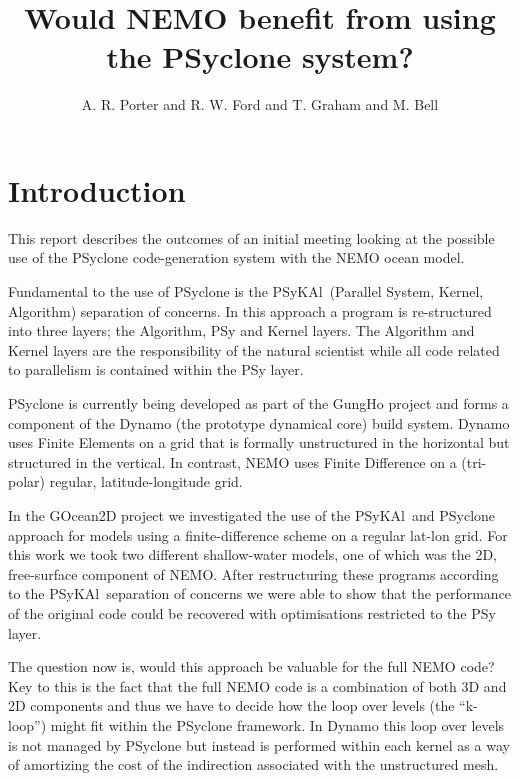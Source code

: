 \documentclass{article}
\newcommand{\psykal}{{PS}y{KA}l}
\begin{document}
\title{Would NEMO benefit from using the PSyclone system?}

\author{A. R. Porter and R. W. Ford and T. Graham and M. Bell}

\maketitle

\section{Introduction}

This report describes the outcomes of an initial meeting looking at
the possible use of the PSyclone code-generation system with the NEMO
ocean model.

Fundamental to the use of PSyclone is the \psykal\ (Parallel System,
Kernel, Algorithm) separation of concerns. In this approach a program
is re-structured into three layers; the Algorithm, PSy and Kernel layers.
The Algorithm and Kernel layers are the responsibility of the natural
 scientist while all code related to parallelism is contained within the
PSy layer.

PSyclone is currently being developed as part of the GungHo project
and forms a component of the Dynamo (the prototype dynamical core)
build system. Dynamo uses Finite Elements on a grid that is formally
unstructured in the horizontal but structured in the vertical.  In
contrast, NEMO uses Finite Difference on a (tri-polar) regular,
latitude-longitude grid.

In the GOcean2D project we investigated the use of the \psykal\ and
PSyclone approach for models using a finite-difference scheme on a
regular lat-lon grid. For this work we took two different
shallow-water models, one of which was the 2D, free-surface component
of NEMO. After restructuring these programs according to the \psykal\
separation of concerns we were able to show that the performance of
the original code could be recovered with optimisations restricted to
the PSy layer.

The question now is, would this approach be valuable for the full NEMO
code?  Key to this is the fact that the full NEMO code is a
combination of both 3D and 2D components and thus we have to decide
how the loop over levels (the ``k-loop'') might fit within the PSyclone
framework. In Dynamo this loop over levels is not managed by PSyclone
but instead is performed within each kernel as a way of amortizing the
cost of the indirection associated with the unstructured mesh.
\end{document}
